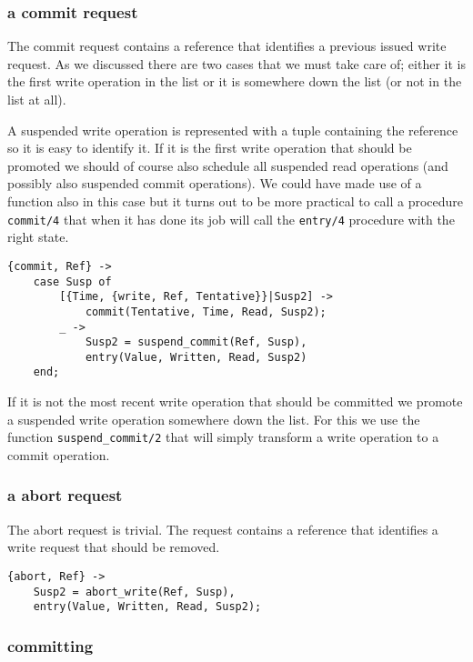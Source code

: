 \documentclass[a4paper, 11pt]{article}
\begin{document}
\subsubsection{a commit request}

The commit request contains a reference that identifies a previous
issued write request. As we discussed there are two cases that we must
take care of; either it is the first write operation in the list or it
is somewhere down the list (or not in the list at all).

A suspended write operation is represented with a tuple containing the
reference so it is easy to identify it. If it is the first write
operation that should be promoted we should of course also schedule
all suspended read operations (and possibly also suspended commit
operations). We could have made use of a function also in this
case but it turns out to be more practical to call a procedure {\tt
  commit/4} that when it has done its job will call the {\tt entry/4}
procedure with the right state.

\begin{verbatim}
{commit, Ref} ->
    case Susp of
        [{Time, {write, Ref, Tentative}}|Susp2] ->
            commit(Tentative, Time, Read, Susp2);
        _ ->
            Susp2 = suspend_commit(Ref, Susp),
            entry(Value, Written, Read, Susp2)
    end;
\end{verbatim}

If it is not the most recent write operation that should be committed
we promote a suspended write operation somewhere down the list. For
this we use the function {\tt suspend\_commit/2} that will simply
transform a write operation to a commit operation.

\subsubsection{a abort request}

The abort request is trivial. The request contains a reference that
identifies a write request that should be removed. 

\begin{verbatim}
{abort, Ref} ->
    Susp2 = abort_write(Ref, Susp),
    entry(Value, Written, Read, Susp2);     
\end{verbatim}


\subsubsection{committing}
\end{document}
